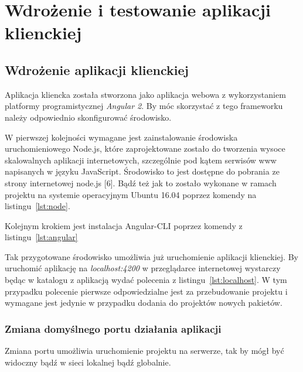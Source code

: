\chapter{Wdrożenie i testowanie aplikacji klienckiej}

\section{Wdrożenie aplikacji klienckiej}

Aplikacja kliencka została stworzona jako aplikacja webowa z wykorzystaniem platformy programistycznej \textit{Angular 2}. By móc skorzystać z tego frameworku należy odpowiednio skonfigurować środowisko.

W pierwszej kolejności wymagane jest zainstalowanie środowiska uruchomieniowego Node.js, które zaprojektowane zostało do tworzenia wysoce skalowalnych aplikacji internetowych, szczególnie pod kątem serwisów www napisanych w języku JavaScript. \'Srodowisko to jest dostępne do pobrania ze strony internetowej node.js [6]. Bądź też jak to zostało wykonane w ramach projektu na systemie operacyjnym Ubuntu 16.04 poprzez komendy na listingu~\ref{lst:node}.

\lssetdef


Kolejnym krokiem jest instalacja Angular-CLI poprzez komendy z listingu~\ref{lst:angular}

\lssetdef


Tak przygotowane środowisko umożliwia już uruchomienie aplikacji klienckiej. By uruchomić aplikację na \textit{localhost:4200} w przeglądarce internetowej wystarczy będąc w katalogu z aplikacją wydać polecenia z listingu~\ref{lst:localhost}. W tym przypadku polecenie pierwsze odpowiedzialne jest za przebudowanie projektu i wymagane jest jedynie w przypadku dodania do projektów nowych pakietów.

\lssetdef


\subsection{Zmiana domyślnego portu działania aplikacji}
Zmiana portu umożliwia uruchomienie projektu na serwerze, tak by mógł być widoczny bądź w sieci lokalnej bądź globalnie. \\

